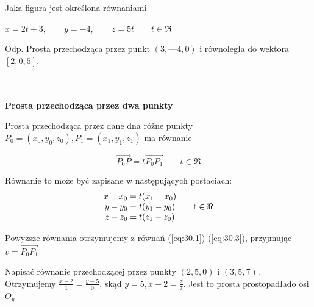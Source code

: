 \begin{przyklad}{30.2}
Jaka figura jest określona równaniami
\begin{center}
$x = 2t+3, \qquad y = -4, \qquad z = 5t \qquad t \in \Re$\\
\end{center}
Odp. Prosta przechodząca przez punkt $(3, —4, 0)$ i równoległa do wektora $[2, 0, 5]$.
\end{przyklad}
\\ \\
\textbf{Prosta przechodząca przez dwa punkty}\\
\begin{pkt}{30.2}
Prosta przechodząca przez dane dna różne punkty $P_0 = (x_0, y_0, z_0), P_1 = (x_1, y_1, z_1)$ ma równanie

\begin{equation}
	\stackrel{\rightarrow}{P_0P} = t\stackrel{\rightarrow}{P_0P_1} \qquad t \in \Re
	\label{eq:30.6}
\end{equation}

Równanie to może być zapisane w następujących postaciach:
\begin{equation}
	\begin{matrix}
	x - x_0 = t(x_1 - x_0)\\
	y - y_0 = t(y_1 - y_0)\\
	z - z_0 = t(z_1 - z_0)\\
	\end{matrix}
	\qquad	\textrm{t} \in \Re\\
	\label{eq:30.7}
\end{equation}
\end{pkt}

\begin{dowod}
Powyższe równania otrzymujemy z równań (\ref{eq:30.1})-(\ref{eq:30.3}), przyjmując $v = \stackrel{\rightarrow}{P_0P_1}$
\end{dowod}

\begin{przyklad}{30.3}
Napisać równanie przechodzącej przez punkty $(2,5,0)$ i $(3,5,7)$.\\
Otrzymujemy $\frac{x-2}{1} = \frac{y-5}{0}$, skąd $y=5, x-2=\frac{z}{7}$. Jest to prosta prostopadłado osi $O_y$
\end{przyklad}


